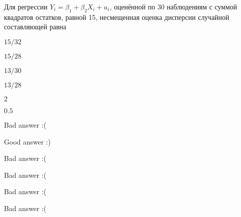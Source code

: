 
\begin{question}
Для регрессии \(Y_i = \beta_1 + \beta_2 X_i + u_i\), оценённой по 30 наблюдениям с суммой квадратов остатков, равной 15, несмещенная оценка дисперсии случайной составляющей равна
\begin{answerlist}
  \item \(15/32\)
  \item \(15/28\)
  \item \(13/30\)
  \item \(13/28\)
  \item \(2\)
  \item \(0.5\)
\end{answerlist}
\end{question}

\begin{solution}
\begin{answerlist}
  \item Bad answer :(
  \item Good answer :)
  \item Bad answer :(
  \item Bad answer :(
  \item Bad answer :(
  \item Bad answer :(
\end{answerlist}
\end{solution}

